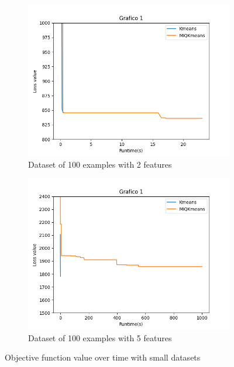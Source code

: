\documentclass{article}
\begin{document}
    \begin{figure}[h]
     \centering
     \begin{subfigure}[b]{0.49\linewidth}
         \centering
         \includegraphics[width=\linewidth]{../results/plots/plot_rl_s100_f2}
         \caption{Dataset of 100 examples with 2 features}
     \end{subfigure}
     \hfill
     \begin{subfigure}[b]{0.49\linewidth}
         \centering
         \includegraphics[width=\linewidth]{../results/plots/plot_rl_s100_f5}
         \caption{Dataset of 100 examples with 5 features}
     \end{subfigure}
    \hfill
    \caption{Objective function value over time with small datasets}
    \label{fig:1}
    \end{figure}
\end{document}
